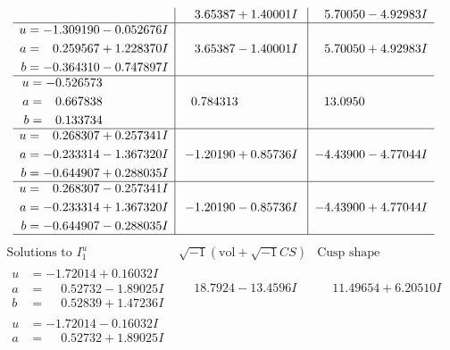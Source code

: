 \documentclass[1p]{elsarticle_modified}
\theoremstyle{definition}
\newcommand{\I}{\sqrt{-1}}
\begin{document}
$$\begin{array}{c|c|c}
 & \phantom{-}3.65387 + 1.40001 I & \phantom{-}5.70050 - 4.92983 I \\ \hline\begin{aligned}
u &= -1.309190 - 0.052676 I \\
a &= \phantom{-}0.259567 + 1.228370 I \\
b &= -0.364310 - 0.747897 I\end{aligned}
 & \phantom{-}3.65387 - 1.40001 I & \phantom{-}5.70050 + 4.92983 I \\ \hline\begin{aligned}
u &= -0.526573\phantom{ +0.000000I} \\
a &= \phantom{-}0.667838\phantom{ +0.000000I} \\
b &= \phantom{-}0.133734\phantom{ +0.000000I}\end{aligned}
 & \phantom{-}0.784313\phantom{ +0.000000I} & \phantom{-}13.0950\phantom{ +0.000000I} \\ \hline\begin{aligned}
u &= \phantom{-}0.268307 + 0.257341 I \\
a &= -0.233314 - 1.367320 I \\
b &= -0.644907 + 0.288035 I\end{aligned}
 & -1.20190 + 0.85736 I & -4.43900 - 4.77044 I \\ \hline\begin{aligned}
u &= \phantom{-}0.268307 - 0.257341 I \\
a &= -0.233314 + 1.367320 I \\
b &= -0.644907 - 0.288035 I\end{aligned}
 & -1.20190 - 0.85736 I & -4.43900 + 4.77044 I\\
 \hline 
 \end{array}$$\newpage$$\begin{array}{c|c|c}  
\text{Solutions to }I^u_{1}& \I (\text{vol} + \sqrt{-1}CS) & \text{Cusp shape}\\
 \hline 
\begin{aligned}
u &= -1.72014 + 0.16032 I \\
a &= \phantom{-}0.52732 - 1.89025 I \\
b &= \phantom{-}0.52839 + 1.47236 I\end{aligned}
 & \phantom{-}18.7924 - 13.4596 I & \phantom{-}11.49654 + 6.20510 I \\ \hline\begin{aligned}
u &= -1.72014 - 0.16032 I \\
a &= \phantom{-}0.52732 + 1.89025 I \\

\end{aligned}
\end{array}$$
\end{document}
